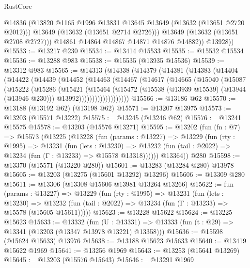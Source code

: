 \begin{lexlean}{RustCore}
\begin{coremodule}
                @14836
                (@13820 @1165 @1996 @13831 @13645 @13649 (@13632 (@13651 @2720 @2012)))
                @13649
                (@13632 (@13651 @2714 @2726)))
              @13649
              (@13632 (@13651 @2708 @2727)))
            @14861
            @14864
            @14867
            @14871
            @14876
            @14882))
        @13928))
@15533 := @13217 @230
@15534 := @13414 @15533
@15535 := @15532 @15534
@15536 := @13288 @983
@15538 := @15535 (@13935 @15536)
@15539 := @13312 @983
@15565 := @14313
    (@14338
      (@14379
        (@14381
          (@14383
            (@14404
              (@14422
                (@14439
                  (@14452
                    (@14463
                      (@14467
                        (@14617
                          (@14665
                            (@15040
                              (@15087
                                (@15222
                                  (@15286
                                    (@15421
                                      (@15464
                                        (@15472
                                          (@15538 (@13939 @15539) (@13944 (@13946 @230)))
                                          @13992)))))))))))))))))))
@15566 := @13186 @62
@15570 := @13188 (@13192 @62) (@13198 @62)
@15571 := @13207 @13975
@15573 := @13203 (@15571 @13222)
@15575 := @13245 (@13246 @62)
@15576 := @13241 @15575
@15578 := @13203 (@15576 @13271)
@15595 := @13202
    (fun (fn : @7) =>
    @15573
      (@13225
        (@13228
          (fun (params : @13227) =>
          @13229
            (fun (rty : @1995) =>
            @13231
              (fun (lets : @13230) =>
              @13232 (fun (tail : @2022) => @13234 (fun (Γ : @13233) => @15578 @13318))))))
        @13364))
    @280
@15598 := @13370 (@15571 (@13220 @280))
@15601 := @13283 (@13284 @280) @13978
@15605 := @13203 (@13275 (@15601 @13292) @13296)
@15606 := @13309 @280
@15611 := @13306 (@13308 @15606 @13981 @13264 @13266)
@15622 := fun (params : @13227) =>
  @13229
    (fun (rty : @1995) =>
    @13231
      (fun (lets : @13230) =>
      @13232 (fun (tail : @2022) => @13234 (fun (Γ : @13233) => @15578 (@15605 @15611)))))
@15623 := @13228 @15622
@15624 := @13225 @15623
@15633 := @13332
    (fun (U : @13331) => @13333 (fun (t : @29) => @13341 (@13203 (@13347 @13978 @13221) @13358)))
@15636 := @15598 (@15624 @15633) @13976
@15638 := @13188 @15623 @15633
@15640 := @13419 @15622 @1969
@15641 := @13256 @1969
@15643 := @13253 (@15641 @13269)
@15645 := @13203 (@15576 @15643)
@15646 := @13291 @1969

\end{coremodule}
\end{lexlean}
